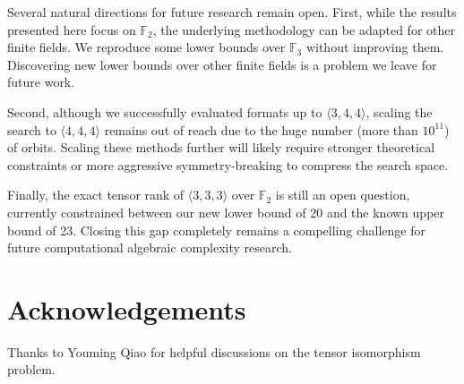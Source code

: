 \documentclass[11pt]{article}
\begin{document}
Several natural directions for future research remain open. First, while the results presented here focus on $\mathbb{F}_2$, the underlying methodology can be adapted for other finite fields. We reproduce some lower bounds over $\mathbb{F}_3$ without improving them. Discovering new lower bounds over other finite fields is a problem we leave for future work.

Second, although we successfully evaluated formats up to $\langle 3,4,4\rangle$, scaling the search to $\langle 4,4,4\rangle$ remains out of reach due to the huge number (more than $10^{11}$) of orbits. Scaling these methods further will likely require stronger theoretical constraints or more aggressive symmetry-breaking to compress the search space.

Finally, the exact tensor rank of $\langle 3,3,3\rangle$ over $\mathbb{F}_2$ is still an open question, currently constrained between our new lower bound of 20 and the known upper bound of 23. Closing this gap completely remains a compelling challenge for future computational algebraic complexity research.

\section*{Acknowledgements}
Thanks to Youming Qiao for helpful discussions on the tensor isomorphism problem.



\end{document}
